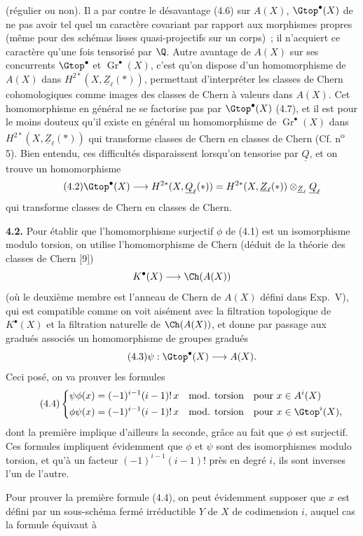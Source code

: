 
(régulier ou non). Il a par contre le désavantage (4.6) sur $A(X)$, $\Gtop^\bullet(X)$ de ne pas avoir tel quel un caractère covariant par rapport aux morphismes propres (même pour des schémas lisses quasi-projectifs sur un corps)~; il n'acquiert ce caractère qu'une fois tensorisé par $\Q$. Autre avantage de $A(X)$ sur ses concurrents $\Gtop^\bullet$ et $\operatorname{Gr}^\bullet(X)$, c'est qu'on dispose d'un homomorphisme de $A(X)$ dans $H^{2*}(X,\underline{Z}_\ell(*))$, permettant d'interpréter les classes de Chern cohomologiques comme images des classes de Chern à valeurs dans $A(X)$. Cet homomorphisme en général ne se factorise pas par $\Gtop^\bullet(X)$ (4.7), et il est pour le moins douteux qu'il existe en général un homomorphisme de $\operatorname{Gr}^\bullet(X)$ dans $H^{2*}(X,\underline{Z}_\ell(*))$ qui transforme classes de Chern en classes de Chern (Cf. n\textsuperscript{o} 5). Bien entendu, ces difficultés disparaissent lorsqu'on tensorise par $\underline{Q}$, et on trouve un homomorphisme
\begin{equation}\tag{4.2}
 \Gtop^\bullet(X)\longrightarrow H^{2*}(X,\underline{Q}_\ell(*))=
 H^{2*}(X,\underline{Z}_\ell(*))\otimes_{\underline{Z}_\ell}\underline{Q}_\ell
\end{equation}
qui transforme classes de Chern en classes de Chern.

\textbf{4.2.} Pour établir que l'homomorphisme surjectif $\phi$ de (4.1) est un isomorphisme modulo torsion, on utilise l'homomorphisme de Chern (déduit de la théorie des classes de Chern [9])
\[
 K^\bullet(X)\longrightarrow \Ch(A(X))
\]
(où le deuxième membre est l'anneau de Chern de $A(X)$ défini dans Exp.~V), qui est compatible comme on voit aisément avec la filtration topologique de $K^\bullet(X)$ et la filtration naturelle de $\Ch(A(X))$, et donne par passage aux gradués associés un homomorphisme de groupes gradués
\begin{equation}\tag{4.3}
 \psi:\Gtop^\bullet(X)\longrightarrow A(X).
\end{equation}
Ceci posé, on va prouver les formules
\begin{equation}\tag{4.4}
\left\{
\begin{aligned}
 \psi\phi(x)&=(-1)^{i-1}(i-1)!\,x\quad \text{mod. torsion}\quad \text{pour } x\in A^i(X)\\
 \phi\psi(x)&=(-1)^{i-1}(i-1)!\,x\quad \text{mod. torsion}\quad \text{pour } x\in \Gtop^i(X),
\end{aligned}
\right.
\end{equation}
dont la première implique d'ailleurs la seconde, grâce au fait que $\phi$ est surjectif. Ces formules impliquent évidemment que $\phi$ et $\psi$ sont des isomorphismes modulo torsion, et qu'à un facteur $(-1)^{i-1}(i-1)!$ près en degré $i$, ils sont inverses l'un de l'autre.

Pour prouver la première formule (4.4), on peut évidemment supposer que $x$ est défini par un sous-schéma fermé irréductible $Y$ de $X$ de codimension $i$, auquel cas la formule équivaut à
